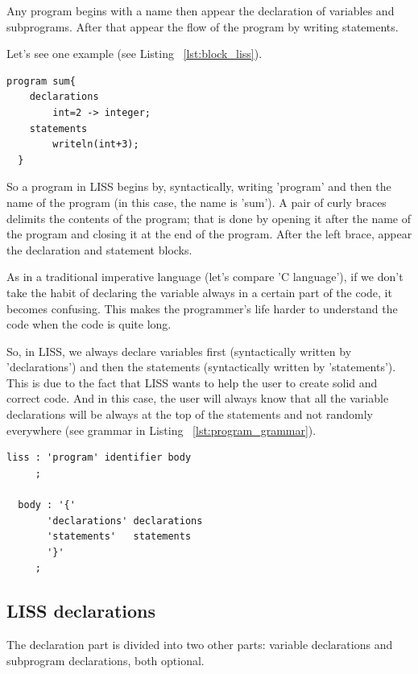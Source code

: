 \documentclass[
  oneside,
  11pt, a4paper,
  footinclude=true,
  headinclude=true,
  cleardoublepage=empty
]{scrbook}
\begin{document}
Any program begins with a name then appear the declaration of variables and subprograms. After that appear the flow of the program by writing statements.

Let's see one example (see Listing ~\ref{lst:block_liss}).

\begin{lstlisting}[caption={The structure of a LISS program (example)},label={lst:block_liss}]
  program sum{
    declarations
        int=2 -> integer;
    statements
        writeln(int+3);
  }
\end{lstlisting}

So a program in LISS begins by, syntactically, writing 'program' and then the name of the program (in this case, the name is 'sum').
A pair of curly braces delimits the contents of the program; that is done by opening it after the name of the program and closing it at the end of the program.
After the left brace, appear the declaration and statement blocks.

As in a traditional imperative language (let's compare 'C language'), if we don't take the habit of declaring the variable always in a certain part of the code, it becomes confusing. This makes the programmer's life harder to understand the code when the code is quite long.

So, in LISS, we always declare variables first (syntactically written by 'declarations')  and then the statements (syntactically written by 'statements').
This is due to the fact that LISS wants to help the user to create solid and correct code. And in this case, the user will always know that all the variable declarations will be always at the top of the statements and not randomly everywhere (see grammar in Listing ~\ref{lst:program_grammar}).

\begin{lstlisting}[caption={CFG for program in LISS},label={lst:program_grammar}]
  liss : 'program' identifier body
     ;

  body : '{'
       'declarations' declarations
       'statements'   statements
       '}'
     ;
\end{lstlisting}

\subsection{LISS declarations} \label{subsec:liss_declarations}
The declaration part is divided into two other parts: variable declarations and subprogram declarations, both optional.
\end{document}

